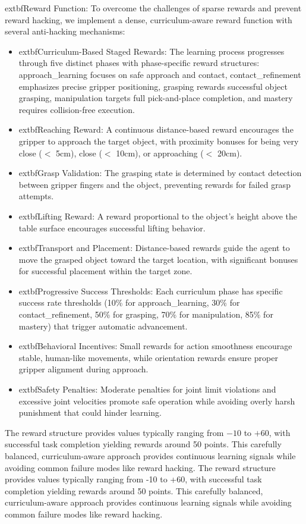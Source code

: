 \documentclass[conference]{IEEEtran}
\begin{document}
	extbf{Reward Function:} To overcome the challenges of sparse rewards and prevent reward hacking, we implement a dense, curriculum-aware reward function with several anti-hacking mechanisms:
\begin{itemize}
    \item 	extbf{Curriculum-Based Staged Rewards:} The learning process progresses through five distinct phases with phase-specific reward structures: approach\_learning focuses on safe approach and contact, contact\_refinement emphasizes precise gripper positioning, grasping rewards successful object grasping, manipulation targets full pick-and-place completion, and mastery requires collision-free execution.
    \item 	extbf{Reaching Reward:} A continuous distance-based reward encourages the gripper to approach the target object, with proximity bonuses for being very close ($<$ 5cm), close ($<$ 10cm), or approaching ($<$ 20cm).
    \item 	extbf{Grasp Validation:} The grasping state is determined by contact detection between gripper fingers and the object, preventing rewards for failed grasp attempts.
    \item 	extbf{Lifting Reward:} A reward proportional to the object's height above the table surface encourages successful lifting behavior.
    \item 	extbf{Transport and Placement:} Distance-based rewards guide the agent to move the grasped object toward the target location, with significant bonuses for successful placement within the target zone.
    \item 	extbf{Progressive Success Thresholds:} Each curriculum phase has specific success rate thresholds (10\% for approach\_learning, 30\% for contact\_refinement, 50\% for grasping, 70\% for manipulation, 85\% for mastery) that trigger automatic advancement.
    \item 	extbf{Behavioral Incentives:} Small rewards for action smoothness encourage stable, human-like movements, while orientation rewards ensure proper gripper alignment during approach.
    \item 	extbf{Safety Penalties:} Moderate penalties for joint limit violations and excessive joint velocities promote safe operation while avoiding overly harsh punishment that could hinder learning.
\end{itemize}
The reward structure provides values typically ranging from $-10$ to $+60$, with successful task completion yielding rewards around 50 points. This carefully balanced, curriculum-aware approach provides continuous learning signals while avoiding common failure modes like reward hacking.
The reward structure provides values typically ranging from -10 to +60, with successful task completion yielding rewards around 50 points. This carefully balanced, curriculum-aware approach provides continuous learning signals while avoiding common failure modes like reward hacking.
\end{document}
